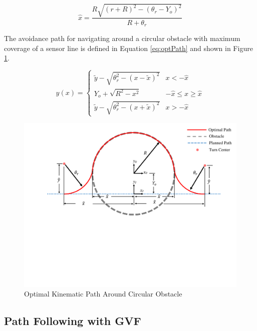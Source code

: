 \documentclass[conf]{new-aiaa}
\begin{document}
\begin{equation}
\label{eq:optPathXhat}
\hat{x} = \frac{R\sqrt{(r+R)^2-(\theta_r-Y_o)^2}}{R+\theta_r}
\end{equation}

The avoidance path for navigating around a circular obstacle with maximum coverage of a sensor line is defined in Equation \ref{eq:optPath} and shown in Figure \ref{fig:optimalpath}.


\begin{equation}
\label{eq:optPath}
y(x) = \left\{
\begin{array}{ll}
\widetilde{y} -\sqrt{\theta_r^2 - (x-\widetilde{x})^2} &  x < -\hat{x} \\
Y_o +\sqrt{R^2 - x^2} & -\hat{x} \leq x \geq \hat{x}\\
\widetilde{y} -\sqrt{\theta_r^2 - (x+\widetilde{x})^2}&  x > -\hat{x}
\end{array}
\right.
\end{equation}

\begin{figure}[H]
	\centering
	\includegraphics[width=0.7\linewidth ,trim=0 265 0 20,clip,width=15cm]{Figures/optimalPath/optimalPath}
	\caption{Optimal Kinematic Path Around Circular Obstacle}
	\label{fig:optimalpath}
\end{figure}




\subsection{Path Following with GVF}
\end{document}
